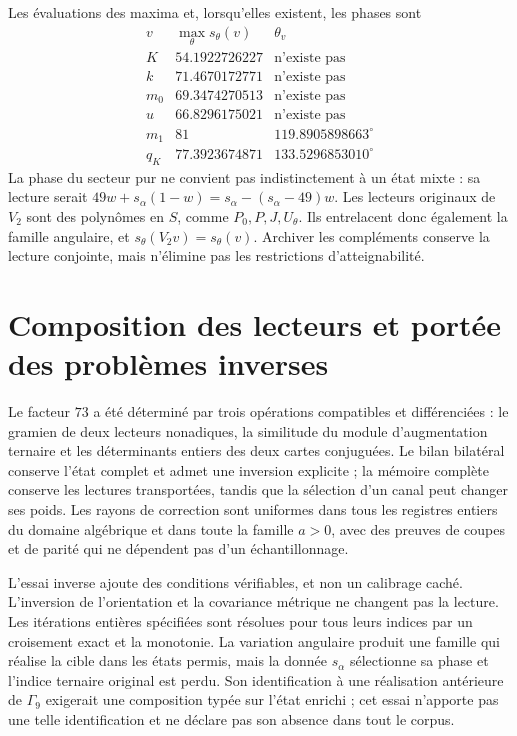 Les évaluations des maxima et, lorsqu’elles existent, les phases sont
\[
\begin{array}{c|c|c}
 v&\max_\theta s_\theta(v)&\theta_v\\\hline
 K&54.1922726227&\text{n'existe pas}\\
 k&71.4670172771&\text{n'existe pas}\\
 m_0&69.3474270513&\text{n'existe pas}\\
 u&66.8296175021&\text{n'existe pas}\\
 m_1&81&119.8905898663^\circ\\
 q_K&77.3923674871&133.5296853010^\circ
\end{array}
\]
La phase du secteur pur ne convient pas indistinctement à un état
mixte : sa lecture serait
\(49w+s_\alpha(1-w)=s_\alpha-(s_\alpha-49)w\).
Les lecteurs originaux de \(V_2\) sont des polynômes en \(S\), comme
\(P_0,P,J,U_\theta\). Ils entrelacent donc également la famille
angulaire, et \(s_\theta(V_2v)=s_\theta(v)\). Archiver les
compléments conserve la lecture conjointe, mais n’élimine pas les
restrictions d’atteignabilité.

\section{Composition des lecteurs et portée des problèmes inverses}
\label{x_reciprocidad:lib02:alcance}

Le facteur \(73\) a été déterminé par trois opérations
compatibles et différenciées : le gramien de deux lecteurs nonadiques, la
similitude du module d’augmentation ternaire et les déterminants entiers des
deux cartes conjuguées. Le bilan bilatéral conserve l’état
complet et admet une inversion explicite ; la mémoire complète conserve les
lectures transportées, tandis que la sélection d’un canal peut changer
ses poids. Les rayons de correction sont uniformes dans tous les registres
entiers du domaine algébrique et dans toute la famille \(a>0\), avec
des preuves de coupes et de parité qui ne dépendent pas d’un échantillonnage.

L'essai inverse ajoute des conditions vérifiables, et non un calibrage caché. L'inversion de l'orientation et la covariance métrique ne changent pas la lecture. Les itérations entières spécifiées sont résolues pour tous leurs indices par un croisement exact et la monotonie. La variation angulaire produit une famille qui réalise la cible dans les états permis, mais la donnée \(s_\alpha\) sélectionne sa phase et l'indice ternaire original est perdu. Son identification à une réalisation antérieure de \(\Gamma_9\) exigerait une composition typée sur l'état enrichi ; cet essai n'apporte pas une telle identification et ne déclare pas son absence dans tout le corpus.

